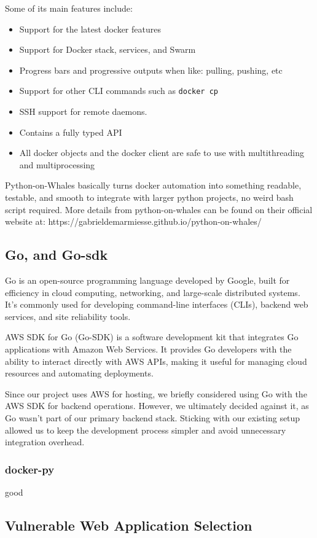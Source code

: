 \documentclass[12pt]{article}
\begin{document}
Some of its main features include:
\begin{itemize}
\item Support for the latest docker features
\item Support for Docker stack, services, and Swarm
\item Progress bars and progressive outputs when like: pulling, pushing, etc
\item Support for other CLI commands such as \texttt{docker cp}
\item SSH support for remote daemons.
\item Contains a fully typed API
\item All docker objects and the docker client are safe to use with multithreading and multiprocessing
\end{itemize}
Python-on-Whales basically turns docker automation into something readable, testable, and smooth to
integrate with larger python projects, no weird bash script required.
More details from python-on-whales can be found on their official website at: https://gabrieldemarmiesse.github.io/python-on-whales/

\subsection{Go, and Go-sdk}
Go is an open-source programming language developed by Google, built for efficiency in cloud computing, networking, and large-scale distributed systems.
It’s commonly used for developing command-line interfaces (CLIs), backend web services, and site reliability tools.

AWS SDK for Go (Go-SDK) is a software development kit that integrates Go applications with Amazon Web Services.
It provides Go developers with the ability to interact directly with AWS APIs, making it useful for managing cloud resources and automating deployments.

Since our project uses AWS for hosting, we briefly considered using Go with the AWS SDK for backend operations.
However, we ultimately decided against it, as Go wasn’t part of our primary backend stack.
Sticking with our existing setup allowed us to keep the development process simpler and avoid unnecessary integration overhead.

\subsubsection{docker-py}
good

\subsection{Vulnerable Web Application Selection}
\end{document}
